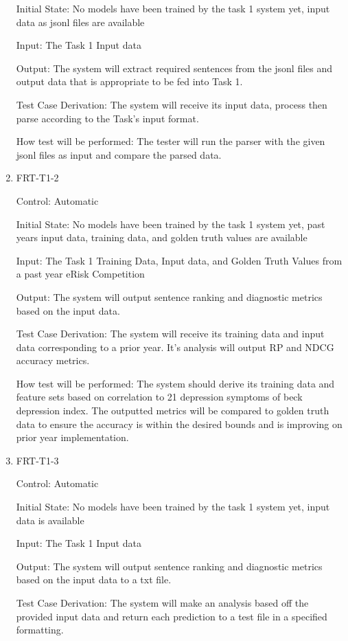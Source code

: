 \documentclass[12pt, titlepage]{article}
\begin{document}
\begin{enumerate}
Initial State: No models have been trained by the task 1 system yet, input data as jsonl files are available

Input: The Task 1 Input data

Output: The system will extract required sentences from the jsonl files and output data that is appropriate to be fed into Task 1.

Test Case Derivation: The system will receive its input data, process then parse according to the Task's input format.

How test will be performed: The tester will run the parser with the given jsonl files as input and compare the parsed data.

\item{FRT-T1-2\\}

Control: Automatic

Initial State: No models have been trained by the task 1 system yet, past years input data, training data, and golden truth values are available

Input: The Task 1 Training Data, Input data, and Golden Truth Values from a past year eRisk Competition

Output: The system will output sentence ranking and diagnostic metrics based on the input data. 

Test Case Derivation: The system will receive its training data and input data corresponding to a prior year. It's analysis will output RP and NDCG accuracy metrics.

How test will be performed: The system should derive its training data and feature sets based on correlation to 21 depression symptoms of beck depression index. The outputted metrics will be compared to golden truth data to ensure the accuracy is within the desired bounds and is improving on prior year implementation.

\item{FRT-T1-3\\}

Control: Automatic

Initial State: No models have been trained by the task 1 system yet, input data is available

Input: The Task 1 Input data

Output: The system will output sentence ranking and diagnostic metrics based on the input data to a txt file.

Test Case Derivation: The system will make an analysis based off the provided input data and return each prediction to a test file in a specified formatting.


\end{enumerate}
\end{document}
